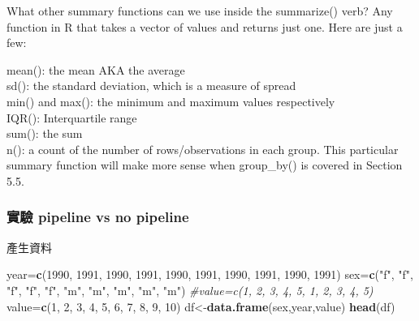 \documentclass[]{book}
\newenvironment{Shaded}{\begin{snugshade}}{\end{snugshade}}
\newcommand{\CommentTok}[1]{\textcolor[rgb]{0.56,0.35,0.01}{\textit{#1}}}
\newcommand{\DecValTok}[1]{\textcolor[rgb]{0.00,0.00,0.81}{#1}}
\newcommand{\KeywordTok}[1]{\textcolor[rgb]{0.13,0.29,0.53}{\textbf{#1}}}
\newcommand{\NormalTok}[1]{#1}
\newcommand{\StringTok}[1]{\textcolor[rgb]{0.31,0.60,0.02}{#1}}
\theoremstyle{definition}
\theoremstyle{definition}
\theoremstyle{definition}
\theoremstyle{remark}
\begin{document}
What other summary functions can we use inside the summarize() verb? Any
function in R that takes a vector of values and returns just one. Here
are just a few:

mean(): the mean AKA the average\\
sd(): the standard deviation, which is a measure of spread\\
min() and max(): the minimum and maximum values respectively\\
IQR(): Interquartile range\\
sum(): the sum\\
n(): a count of the number of rows/observations in each group. This
particular summary function will make more sense when group\_by() is
covered in Section 5.5.

\hypertarget{-pipeline-vs-no-pipeline}{%
\subsubsection{實驗 pipeline vs no
pipeline}\label{-pipeline-vs-no-pipeline}}

產生資料

\begin{Shaded}
\begin{Highlighting}[]
\NormalTok{year=}\KeywordTok{c}\NormalTok{(}\DecValTok{1990}\NormalTok{,    }\DecValTok{1991}\NormalTok{,   }\DecValTok{1990}\NormalTok{,   }\DecValTok{1991}\NormalTok{,   }\DecValTok{1990}\NormalTok{,   }\DecValTok{1991}\NormalTok{,   }\DecValTok{1990}\NormalTok{,   }\DecValTok{1991}\NormalTok{,   }\DecValTok{1990}\NormalTok{,   }\DecValTok{1991}\NormalTok{) }
\NormalTok{sex=}\KeywordTok{c}\NormalTok{(}\StringTok{"f"}\NormalTok{,  }\StringTok{"f"}\NormalTok{,    }\StringTok{"f"}\NormalTok{,    }\StringTok{"f"}\NormalTok{,    }\StringTok{"f"}\NormalTok{,    }\StringTok{"m"}\NormalTok{,    }\StringTok{"m"}\NormalTok{,    }\StringTok{"m"}\NormalTok{,    }\StringTok{"m"}\NormalTok{,    }\StringTok{"m"}\NormalTok{)}
\CommentTok{#value=c(1, 2,  3,  4,  5,  1,  2,  3,  4,  5)}
\NormalTok{value=}\KeywordTok{c}\NormalTok{(}\DecValTok{1}\NormalTok{,  }\DecValTok{2}\NormalTok{,  }\DecValTok{3}\NormalTok{,  }\DecValTok{4}\NormalTok{,  }\DecValTok{5}\NormalTok{,  }\DecValTok{6}\NormalTok{,  }\DecValTok{7}\NormalTok{,  }\DecValTok{8}\NormalTok{,  }\DecValTok{9}\NormalTok{,  }\DecValTok{10}\NormalTok{)}
\NormalTok{df<-}\KeywordTok{data.frame}\NormalTok{(sex,year,value)}
\KeywordTok{head}\NormalTok{(df)}
\end{Highlighting}
\end{Shaded}
\end{document}
